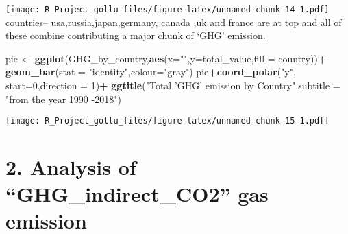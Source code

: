 \documentclass[
]{article}
\newenvironment{Shaded}{\begin{snugshade}}{\end{snugshade}}
\newcommand{\DataTypeTok}[1]{\textcolor[rgb]{0.13,0.29,0.53}{#1}}
\newcommand{\DecValTok}[1]{\textcolor[rgb]{0.00,0.00,0.81}{#1}}
\newcommand{\KeywordTok}[1]{\textcolor[rgb]{0.13,0.29,0.53}{\textbf{#1}}}
\newcommand{\NormalTok}[1]{#1}
\newcommand{\OperatorTok}[1]{\textcolor[rgb]{0.81,0.36,0.00}{\textbf{#1}}}
\newcommand{\StringTok}[1]{\textcolor[rgb]{0.31,0.60,0.02}{#1}}
\begin{document}
\texttt{[image: R\_Project\_gollu\_files/figure-latex/unnamed-chunk-14-1.pdf]}
countries-- usa,russia,japan,germany, canada ,uk and france are at top
and all of these combine contributing a major chunk of `GHG' emission.

\begin{Shaded}
\begin{Highlighting}[]
\NormalTok{pie <-}\StringTok{ }\KeywordTok{ggplot}\NormalTok{(GHG_by_country,}\KeywordTok{aes}\NormalTok{(}\DataTypeTok{x=}\StringTok{""}\NormalTok{,}\DataTypeTok{y=}\NormalTok{total_value,}\DataTypeTok{fill =}\NormalTok{ country))}\OperatorTok{+}
\StringTok{  }\KeywordTok{geom_bar}\NormalTok{(}\DataTypeTok{stat =} \StringTok{"identity"}\NormalTok{,}\DataTypeTok{colour=}\StringTok{"gray"}\NormalTok{)}
\NormalTok{pie}\OperatorTok{+}\KeywordTok{coord_polar}\NormalTok{(}\StringTok{"y"}\NormalTok{, }\DataTypeTok{start=}\DecValTok{0}\NormalTok{,}\DataTypeTok{direction =} \DecValTok{1}\NormalTok{)}\OperatorTok{+}
\StringTok{  }\KeywordTok{ggtitle}\NormalTok{(}\StringTok{"Total 'GHG' emission by Country"}\NormalTok{,}\DataTypeTok{subtitle =} \StringTok{"from the year 1990 -2018"}\NormalTok{)}
\end{Highlighting}
\end{Shaded}

\texttt{[image: R\_Project\_gollu\_files/figure-latex/unnamed-chunk-15-1.pdf]}

\hypertarget{analysis-of-ghg_indirect_co2-gas-emission}{%
\section{2. Analysis of ``GHG\_indirect\_CO2'' gas
emission}\label{analysis-of-ghg_indirect_co2-gas-emission}}
\end{document}

